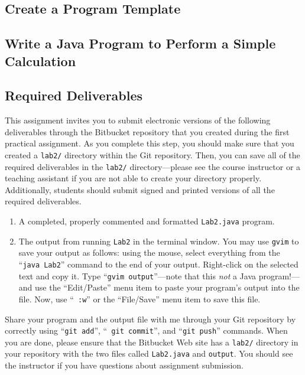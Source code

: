 \subsection*{Create a Program Template}

\vspace*{-.1in}
\subsection*{Write a Java Program to Perform a Simple Calculation}

\subsection*{Required Deliverables}

This assignment invites you to submit electronic versions of the following deliverables through the Bitbucket repository
that you created during the first practical assignment.  As you complete this step, you should make sure that you
created a {\tt lab2/} directory within the Git repository.  Then, you can save all of the required deliverables in the
{\tt lab2/} directory---please see the course instructor or a teaching assistant if you are not able to create your
directory properly.  Additionally, students should submit signed and printed versions of all the required deliverables.

\begin{enumerate}

	\item A completed, properly commented and formatted {\tt Lab2.java} program.

        \item The output from running {\tt Lab2} in the terminal window. You may use {\tt gvim} to save your output as
          follows: using the mouse, select everything from the ``{\tt java Lab2}'' command to the end of your output.
          Right-click on the selected text and copy it.  Type ``{\tt gvim output}''---note that this {\em not} a Java
          program!---and use the ``Edit/Paste'' menu item to paste your program's output into the file.  Now, use ``{\tt
          :w}'' or the ``File/Save'' menu item to save this file.

\end{enumerate}

Share your program and the output file with me through your Git repository by correctly using ``{\tt git add}'', ``{\tt
git commit}'', and ``{\tt git push}'' commands. When you are done, please ensure that the Bitbucket Web site has
a {\tt lab2/} directory in your repository with the two files called {\tt Lab2.java} and {\tt output}. You should see 
the instructor if you have questions about assignment submission.

